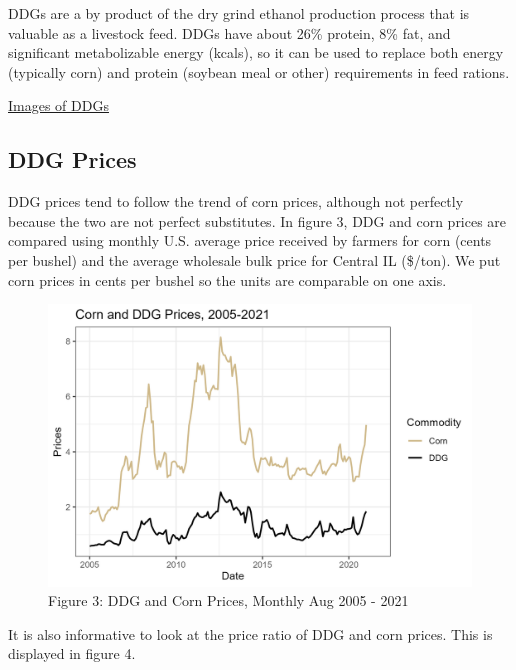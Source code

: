 \documentclass[
  letterpaper,
  DIV=11,
  numbers=noendperiod]{scrreprt}
\begin{document}
DDGs are a by product of the dry grind ethanol production process that
is valuable as a livestock feed. DDGs have about 26\% protein, 8\% fat,
and significant metabolizable energy (kcals), so it can be used to
replace both energy (typically corn) and protein (soybean meal or other)
requirements in feed rations.

\href{https://www.google.com/search?q=ddgs&source=lnms&tbm=isch&sa=X&ved=0ahUKEwj4udmomr7JAhWF2B4KHailApcQ_AUICCgC&biw=1920&bih=1031\#}{Images
of DDGs}

\subsection{DDG Prices}\label{ddg-prices}

DDG prices tend to follow the trend of corn prices, although not
perfectly because the two are not perfect substitutes. In figure 3, DDG
and corn prices are compared using monthly U.S. average price received
by farmers for corn (cents per bushel) and the average wholesale bulk
price for Central IL (\$/ton). We put corn prices in cents per bushel so
the units are comparable on one axis.

\begin{figure}[H]

{\centering \includegraphics{assets/CornDDGPrices.png}

}

\caption{Figure 3: DDG and Corn Prices, Monthly Aug 2005 - 2021}

\end{figure}%

It is also informative to look at the price ratio of DDG and corn
prices. This is displayed in figure 4.
\end{document}
